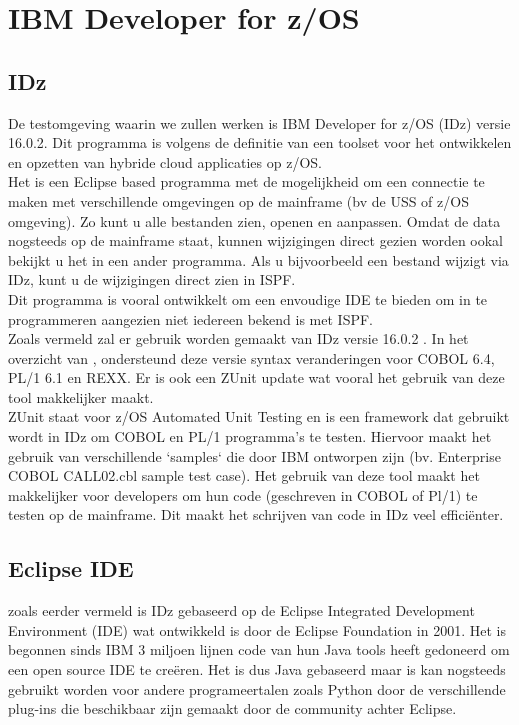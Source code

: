 \section{IBM Developer for z/OS}
\label{sec:IBM Developer for z/OS (IDz)}
\subsection{IDz}
De testomgeving waarin we zullen werken is IBM Developer for z/OS (IDz) versie 16.0.2. Dit programma is volgens de definitie van \textcite{Spohn2023} een toolset voor het ontwikkelen en opzetten van hybride cloud applicaties op z/OS. \\
Het is een Eclipse based programma met de mogelijkheid om een connectie te maken met verschillende omgevingen op de mainframe (bv de USS of z/OS omgeving). Zo kunt u alle bestanden zien, openen en aanpassen. Omdat de data nogsteeds op de mainframe staat, kunnen wijzigingen direct gezien worden ookal bekijkt u het in een ander programma. Als u bijvoorbeeld een bestand wijzigt via IDz, kunt u de wijzigingen direct zien in ISPF. \\
Dit programma is vooral ontwikkelt om een envoudige IDE te bieden om in te programmeren aangezien niet iedereen bekend is met ISPF. \\

Zoals vermeld zal er gebruik worden gemaakt van IDz versie 16.0.2 . In het overzicht van \textcite{IBM2024}, ondersteund deze versie syntax veranderingen voor COBOL 6.4, PL/1 6.1 en REXX. Er is ook een ZUnit update wat vooral het gebruik van deze tool makkelijker maakt. \\

ZUnit staat voor z/OS Automated Unit Testing en is een framework dat gebruikt wordt in IDz om COBOL en PL/1 programma's te testen. Hiervoor maakt het gebruik van verschillende `samples` die door IBM ontworpen zijn (bv. Enterprise COBOL CALL02.cbl sample test case). Het gebruik van deze tool maakt het makkelijker voor developers om hun code (geschreven in COBOL of Pl/1) te testen op de mainframe. Dit maakt het schrijven van code in IDz veel efficiënter. \autocite{IBM2024a}

\subsection{Eclipse IDE}
zoals eerder vermeld is IDz gebaseerd op de Eclipse Integrated Development Environment (IDE) wat ontwikkeld is door de Eclipse Foundation in 2001. Het is begonnen sinds IBM 3 miljoen lijnen code van hun Java tools heeft gedoneerd om een open source IDE te creëren. Het is dus Java gebaseerd maar is kan nogsteeds gebruikt worden voor andere programeertalen zoals Python door de verschillende plug-ins die beschikbaar zijn gemaakt door de community achter Eclipse. \autocite{Hanna2021} \\

